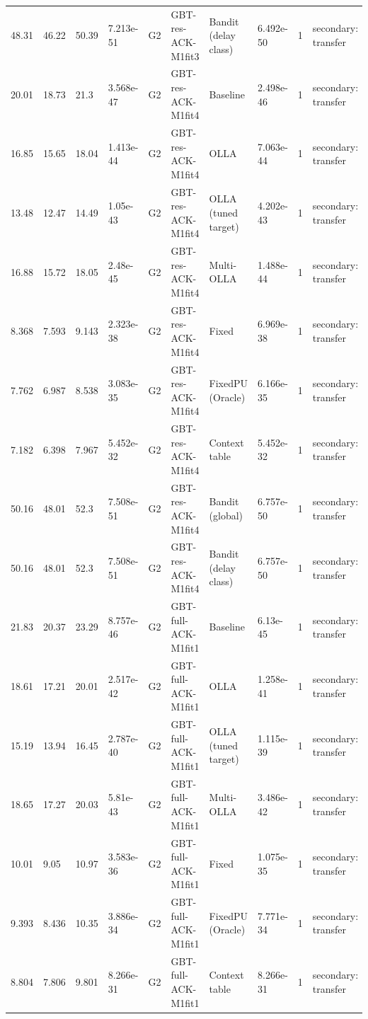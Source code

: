\documentclass[10pt]{article}
\begin{document}
\begin{landscape}
\begin{longtable}{@{}llllllllll@{}}
48.31 & 46.22 & 50.39 & 7.213e-51 & G2 & GBT-res-ACK-M1fit3 & Bandit (delay class) & 6.492e-50 & 1 & secondary: transfer \\
20.01 & 18.73 & 21.3 & 3.568e-47 & G2 & GBT-res-ACK-M1fit4 & Baseline & 2.498e-46 & 1 & secondary: transfer \\
16.85 & 15.65 & 18.04 & 1.413e-44 & G2 & GBT-res-ACK-M1fit4 & OLLA & 7.063e-44 & 1 & secondary: transfer \\
13.48 & 12.47 & 14.49 & 1.05e-43 & G2 & GBT-res-ACK-M1fit4 & OLLA (tuned target) & 4.202e-43 & 1 & secondary: transfer \\
16.88 & 15.72 & 18.05 & 2.48e-45 & G2 & GBT-res-ACK-M1fit4 & Multi-OLLA & 1.488e-44 & 1 & secondary: transfer \\
8.368 & 7.593 & 9.143 & 2.323e-38 & G2 & GBT-res-ACK-M1fit4 & Fixed & 6.969e-38 & 1 & secondary: transfer \\
7.762 & 6.987 & 8.538 & 3.083e-35 & G2 & GBT-res-ACK-M1fit4 & FixedPU (Oracle) & 6.166e-35 & 1 & secondary: transfer \\
7.182 & 6.398 & 7.967 & 5.452e-32 & G2 & GBT-res-ACK-M1fit4 & Context table & 5.452e-32 & 1 & secondary: transfer \\
50.16 & 48.01 & 52.3 & 7.508e-51 & G2 & GBT-res-ACK-M1fit4 & Bandit (global) & 6.757e-50 & 1 & secondary: transfer \\
50.16 & 48.01 & 52.3 & 7.508e-51 & G2 & GBT-res-ACK-M1fit4 & Bandit (delay class) & 6.757e-50 & 1 & secondary: transfer \\
21.83 & 20.37 & 23.29 & 8.757e-46 & G2 & GBT-full-ACK-M1fit1 & Baseline & 6.13e-45 & 1 & secondary: transfer \\
18.61 & 17.21 & 20.01 & 2.517e-42 & G2 & GBT-full-ACK-M1fit1 & OLLA & 1.258e-41 & 1 & secondary: transfer \\
15.19 & 13.94 & 16.45 & 2.787e-40 & G2 & GBT-full-ACK-M1fit1 & OLLA (tuned target) & 1.115e-39 & 1 & secondary: transfer \\
18.65 & 17.27 & 20.03 & 5.81e-43 & G2 & GBT-full-ACK-M1fit1 & Multi-OLLA & 3.486e-42 & 1 & secondary: transfer \\
10.01 & 9.05 & 10.97 & 3.583e-36 & G2 & GBT-full-ACK-M1fit1 & Fixed & 1.075e-35 & 1 & secondary: transfer \\
9.393 & 8.436 & 10.35 & 3.886e-34 & G2 & GBT-full-ACK-M1fit1 & FixedPU (Oracle) & 7.771e-34 & 1 & secondary: transfer \\
8.804 & 7.806 & 9.801 & 8.266e-31 & G2 & GBT-full-ACK-M1fit1 & Context table & 8.266e-31 & 1 & secondary: transfer \\

\end{longtable}
\end{landscape}
\end{document}

